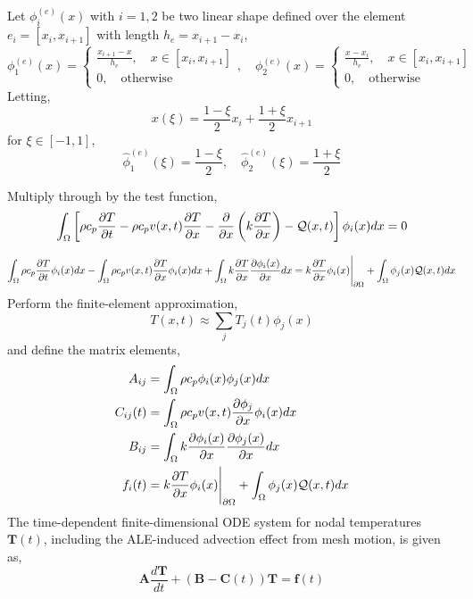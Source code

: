 Let $\phi^{(e)}_i(x)$ with $i=1,2$ be two linear shape defined over the element $e_i=[x_{i},x_{i+1}]$ with length $h_e=x_{i+1} - x_i$,
\begin{equation}
    \phi^{(e)}_1(x) = \left\{\begin{matrix}
        \frac{x_{i+1} - x}{h_e},\quad x\in[x_i,x_{i+1}]\\
        0, \quad \text{otherwise}
    \end{matrix}\right.,\quad\phi^{(e)}_2(x) = \left\{\begin{matrix}
        \frac{x - x_i}{h_e},\quad x\in[x_i,x_{i+1}]\\
        0, \quad \text{otherwise}
    \end{matrix}\right.
\end{equation}
Letting,
\[
    x(\xi) = \frac{1-\xi}{2}x_i + \frac{1 + \xi}{2}x_{i+1}
\]
for $\xi\in[-1,1]$,
\begin{equation}
    \hat{\phi}_1^{(e)}(\xi) = \frac{1 - \xi}{2},\quad \hat{\phi}_2^{(e)}(\xi) = \frac{1 + \xi}{2}
\end{equation}

Multiply through by the test function,
\begin{equation}
    \int_{\Omega}\left[\rho c_p\frac{\partial T}{\partial t} - \rho c_p v(x,t)\frac{\partial T}{\partial x} - \frac{\partial}{\partial x}\left(k\frac{\partial T}{\partial x}\right) - \mathcal{Q}(x,t)\right]\phi_i(x)dx = 0
\end{equation}

\begin{equation}
    \int_{\Omega}\rho c_p\frac{\partial T}{\partial t}\phi_i(x)dx - \int_{\Omega}\rho c_p v(x,t)\frac{\partial T}{\partial x}\phi_i(x)dx + \int_{\Omega} k\frac{\partial T}{\partial x}\frac{\partial\phi_i(x)}{\partial x} dx = k\frac{\partial T}{\partial x}\phi_i(x)\Bigg|_{\partial\Omega} + \int_{\Omega}\phi_j(x)\mathcal{Q}(x,t)dx
\end{equation}
Perform the finite-element approximation,
\begin{equation}
    T(x,t)\approx\sum_jT_j(t)\phi_j(x)
\end{equation}
and define the matrix elements,
\begin{align}
    A_{ij} &= \int_{\Omega}\rho c_p\phi_i(x)\phi_j(x)dx\\
    C_{ij}(t) &= \int_{\Omega}\rho c_p v(x,t) \frac{\partial\phi_j}{\partial x}\phi_i(x)dx\\
    B_{ij} &= \int_{\Omega}k\frac{\partial\phi_i(x)}{\partial x}\frac{\partial\phi_j(x)}{\partial x}dx\\
    f_i(t) &= k\frac{\partial T}{\partial x}\phi_i(x)\Bigg|_{\partial\Omega} + \int_{\Omega}\phi_j(x)\mathcal{Q}(x,t)dx
\end{align}
The time-dependent finite-dimensional ODE system for nodal temperatures $\mathbf{T}(t)$, including the ALE-induced advection effect from mesh motion, is given as,
\begin{equation}
    \mathbf{A}\frac{d\mathbf{T}}{dt} + \left(\mathbf{B} - \mathbf{C}(t)\right)\mathbf{T} = \mathbf{f}(t)
\end{equation}

